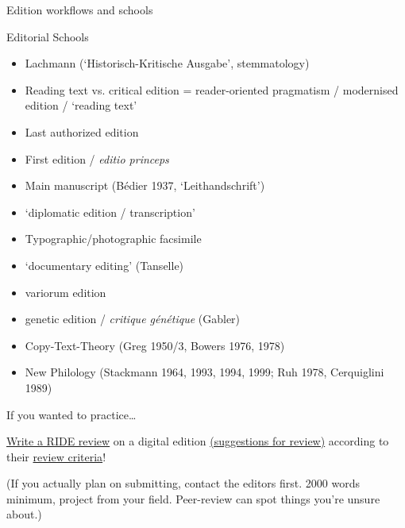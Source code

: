 \begin{frame}[allowframebreaks]{Edition workflows and schools}
\framebreak

\begin{block}{Editorial Schools}
\begin{multicols}{2}
\begin{itemize}
\item Lachmann (`Historisch-Kritische Ausgabe', stemmatology)
\item Reading text vs. critical edition = reader-oriented pragmatism / modernised edition / `reading text'
\item  Last authorized edition
\item  First edition / \emph{editio princeps}
\item Main manuscript (Bédier 1937, `Leithandschrift')
\item `diplomatic edition / transcription'
\item Typographic/photographic facsimile
\item `documentary editing' (Tanselle)
\item variorum edition
\item genetic edition / \emph{critique génétique} (Gabler)
\item Copy-Text-Theory (Greg 1950/3, Bowers 1976, 1978)
\item New Philology (Stackmann 1964, 1993, 1994, 1999; Ruh 1978, Cerquiglini 1989)
\end{itemize}
\end{multicols}
\end{block}

\end{frame}







\begin{frame}[standout]

  \alert{If you wanted to practice\dots}
  
  \normalsize
  \href{https://ride.i-d-e.de/reviewers/call-for-reviews/}{Write a RIDE review} on a digital edition \alert{\href{https://ride.i-d-e.de/reviewers/suggested-projects-for-review/}{(suggestions for review)}} according to their \alert{\href{https://ride.i-d-e.de/reviewers/submission-guidelines/}{review criteria}}!
  
  \footnotesize (If you actually plan on submitting, contact the editors first. 2000 words minimum, project from your field. Peer-review can spot things you're unsure about.)
\end{frame}
